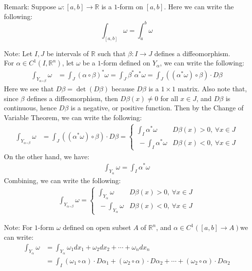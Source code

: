 \documentclass[11pt,oneside]{book}
\theoremstyle{break}
\theoremstyle{break}
\newcommand{\R}{\mathbb{R}}
\newcommand{\note}{\color{red}Note: \color{black}}
\newcommand{\remark}{\color{blue}Remark: \color{black}}
\begin{document}
\remark Suppose $\omega:[a,b]\to \R$ is a $1$-form on $[a,b]$. Here we can write the following:
$$\int_{[a,b]} \omega = \int_a^b \omega$$


\note Let $I,J$ be intervals of $\R$ such that $\beta:I\to J$ defines a diffeomorphism. \\
For $\alpha \in C^1(I,\R^n)$, let $\omega$ be a $1$-form defined on $Y_\alpha$, we can write the following:
\begin{align*}
\int_{Y_{\alpha\circ \beta}} \omega &= \int_{J} (\alpha\circ \beta)^*\omega =\int_J \beta^*\alpha^*\omega = \int_J ((\alpha^*\omega) \circ \beta)\cdot D\beta
\end{align*}
Here we see that $D\beta = \det(D\beta)$ because $D\beta$ is a $1\times 1$ matrix. Also note that, since $\beta$ defines a diffeomorphism, then $D\beta(x)\neq 0$ for all $x \in J$, and $D\beta$ is continuous, hence $D\beta$ is a negative, or positive function. Then by the Change of Variable Theorem, we can write the following:
\begin{align*}
\int_{Y_{\alpha\circ \beta}} \omega &= \int_J ((\alpha^*\omega) \circ \beta)\cdot D\beta = \begin{cases}\int_I \alpha^*\omega & D\beta(x) > 0,\ \forall x \in J\\\ -\int_I \alpha^*\omega & D\beta(x) < 0,\ \forall x \in J \end{cases}
\end{align*}
On the other hand, we have:
\begin{align*}
\int_{Y_\alpha} \omega = \int_{I} \alpha^*\omega 
\end{align*}
Combining, we can write the following:
\begin{align*}
\int_{Y_{\alpha\circ \beta}} \omega = \begin{cases}\int_{Y_\alpha} \omega & D\beta(x) > 0,\ \forall x \in J\\\ -\int_{Y_\alpha} \omega & D\beta(x) < 0,\ \forall x \in J \end{cases}
\end{align*}

\note For $1$-form $\omega$ defined on open subset $A$ of $\R^n$, and $\alpha\in C^1([a,b] \to A)$we can write:
\begin{align*}
\int_{Y_\alpha} \omega &= \int_{Y_\alpha} \omega_1dx_1+\omega_2dx_2+\cdots +\omega_n dx_n \\&= \int_{I} (\omega_1\circ \alpha)\cdot  D\alpha_1 + (\omega_2\circ \alpha)\cdot  D\alpha_2
+\cdots + (\omega_2\circ \alpha)\cdot  D\alpha_2
\end{align*}
\end{document}
